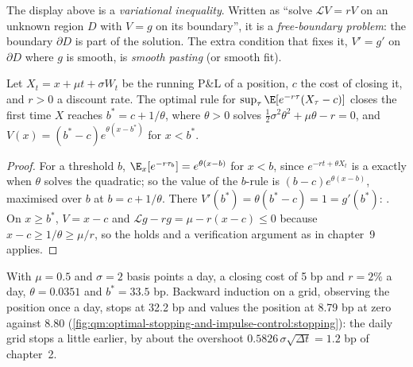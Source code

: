 \begin{definition}\label{def:qm:optimal-stopping-and-impulse-control:fbp}
The display above is a \emph{variational inequality}. Written as ``solve $\mathcal LV = rV$ on
an unknown region $D$ with $V = g$ on its boundary'', it is a \emph{free-boundary problem}:
the boundary $\partial D$ is part of the solution. The extra condition that fixes it, $V' = g'$ on $\partial D$ where $g$ is
smooth, is \emph{smooth pasting} (or smooth fit).
\end{definition}

\begin{proposition}\label{prop:qm:optimal-stopping-and-impulse-control:drift}
Let $X_t = x + \mu t + \sigma W_t$ be the running P\&L of a position, $c$ the cost of closing it, and $r > 0$ a discount rate.
The optimal rule for $\sup_\tau\E[e^{-r\tau}(X_\tau - c)]$ closes the first time $X$ reaches $b^* = c + 1/\theta$, where $\theta > 0$ solves
$\tfrac12\sigma^2\theta^2 + \mu\theta - r = 0$, and $V(x) = (b^* - c)e^{\theta(x - b^*)}$ for $x < b^*$.
\end{proposition}

\begin{proof}
For a threshold $b$, $\E_x[e^{-r\tau_b}] = e^{\theta(x - b)}$ for $x < b$, since $e^{-rt + \theta X_t}$ is a  exactly when
$\theta$ solves the quadratic; so the value of the $b$-rule is $(b - c)e^{\theta(x - b)}$, maximised over $b$ at $b = c + 1/\theta$.
There $V'(b^*) = \theta(b^* - c) = 1 = g'(b^*)$: . On $x \ge b^*$, $V = x - c$ and $\mathcal Lg - rg = \mu - r(x - c) \le 0$
because $x - c \ge 1/\theta \ge \mu/r$, so the  holds and a verification argument as in chapter~9
applies.
\end{proof}

With $\mu = 0.5$ and $\sigma = 2$ basis points a day, a closing cost of 5 bp and $r = 2\%$ a day, $\theta = 0.0351$ and $b^* = 33.5$ bp.
Backward induction on a grid, observing the position once a day, stops at 32.2 bp and values the position at 8.79
bp at zero against 8.80 (\cref{fig:qm:optimal-stopping-and-impulse-control:stopping}): the daily grid stops a
little earlier, by about the overshoot $0.5826\,\sigma\sqrt{\Delta t} = 1.2$ bp of chapter~2.

